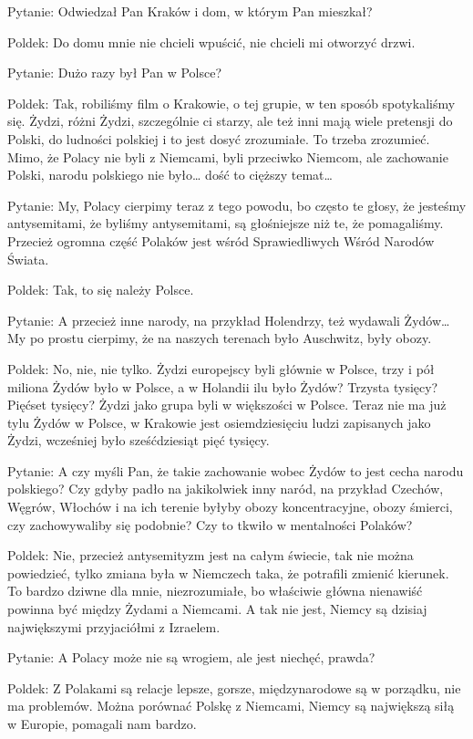 Pytanie: Odwiedzał Pan Kraków i dom, w którym Pan mieszkał? 

Poldek: Do domu mnie nie chcieli wpuścić, nie chcieli mi otworzyć drzwi. 

Pytanie: Dużo razy był Pan w Polsce? 

Poldek: Tak, robiliśmy film o Krakowie, o tej grupie, w ten sposób spotykaliśmy się. Żydzi, różni Żydzi, szczególnie ci starzy, ale też inni mają wiele pretensji do Polski, do ludności polskiej i to jest dosyć zrozumiałe. To trzeba zrozumieć. Mimo, że Polacy nie byli z Niemcami, byli przeciwko Niemcom, ale zachowanie Polski, narodu polskiego nie było… dość to cięższy temat… 

Pytanie: My, Polacy cierpimy teraz z tego powodu, bo często te głosy, że jesteśmy antysemitami, że byliśmy antysemitami, są głośniejsze niż te, że pomagaliśmy. Przecież ogromna część Polaków jest wśród Sprawiedliwych Wśród Narodów Świata. 

Poldek: Tak, to się należy Polsce. 

Pytanie: A przecież inne narody, na przykład Holendrzy, też wydawali Żydów… My po prostu cierpimy, że na naszych terenach było Auschwitz, były obozy. 

Poldek: No, nie, nie tylko. Żydzi europejscy byli głównie w Polsce, trzy i pół miliona Żydów było w Polsce, a w Holandii ilu było Żydów? Trzysta tysięcy? Pięćset tysięcy? Żydzi jako grupa byli w większości w Polsce. Teraz nie ma już tylu Żydów w Polsce, w Krakowie jest osiemdziesięciu ludzi zapisanych jako Żydzi, wcześniej było sześćdziesiąt pięć tysięcy. 

Pytanie: A czy myśli Pan, że takie zachowanie wobec Żydów to jest cecha narodu polskiego? Czy gdyby padło na jakikolwiek inny naród, na przykład Czechów, Węgrów, Włochów i na ich terenie byłyby obozy koncentracyjne, obozy śmierci, czy zachowywaliby się podobnie? Czy to tkwiło w mentalności Polaków?  

Poldek: Nie, przecież antysemityzm jest na całym świecie, tak nie można powiedzieć, tylko zmiana była w Niemczech taka, że potrafili zmienić kierunek. To bardzo dziwne dla mnie, niezrozumiałe, bo właściwie główna nienawiść powinna być między Żydami a Niemcami. A tak nie jest, Niemcy są dzisiaj największymi przyjaciółmi z Izraelem. 

Pytanie: A Polacy może nie są wrogiem, ale jest niechęć, prawda? 

Poldek: Z Polakami są relacje lepsze, gorsze, międzynarodowe są w porządku, nie ma problemów. Można porównać Polskę z Niemcami, Niemcy są największą siłą w Europie, pomagali nam bardzo.   

 
